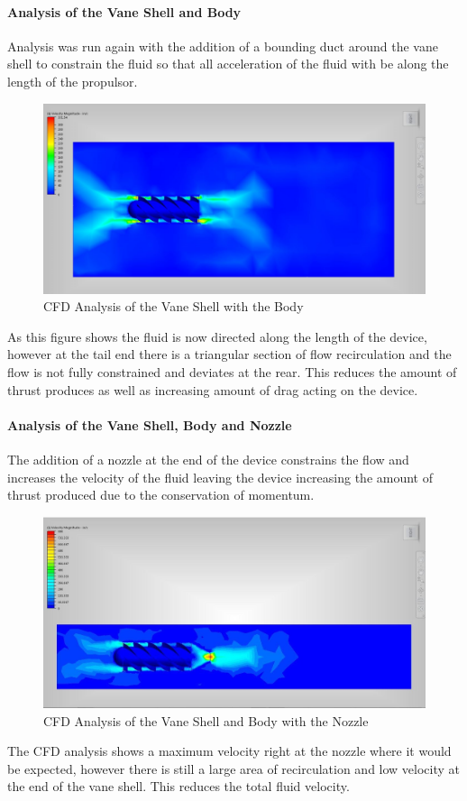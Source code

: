\documentclass{report}
\begin{document}
\paragraph{Analysis of the Vane Shell and Body}
Analysis was run again with the addition of a bounding duct around the vane shell to constrain the fluid so that all acceleration of the fluid with be along the length of the propulsor. 
\begin{figure}[H]
\centering
\includegraphics[width=12cm]{CFDvsb}
\caption{CFD Analysis of the Vane Shell with the Body}
\end{figure}
As this figure shows the fluid is now directed along the length of the device, however at the tail end there is a triangular section of flow recirculation and the flow is not fully constrained and deviates at the rear. This reduces the amount of thrust produces as well as increasing amount of drag acting on the device.
\paragraph{Analysis of the Vane Shell, Body and Nozzle}
The addition of a nozzle at the end of the device constrains the flow and increases the velocity of the fluid leaving the device increasing the amount of thrust produced due to the conservation of momentum.
\begin{figure}[H]
\centering
\includegraphics[width=12cm]{CFDvsbn}
\caption{CFD Analysis of the Vane Shell and Body  with the Nozzle} 
\end{figure}
The CFD analysis shows a maximum velocity right at the nozzle where it would be expected, however there is still a large area of recirculation and low velocity at the end of the vane shell. This reduces the total fluid velocity.
\end{document}
